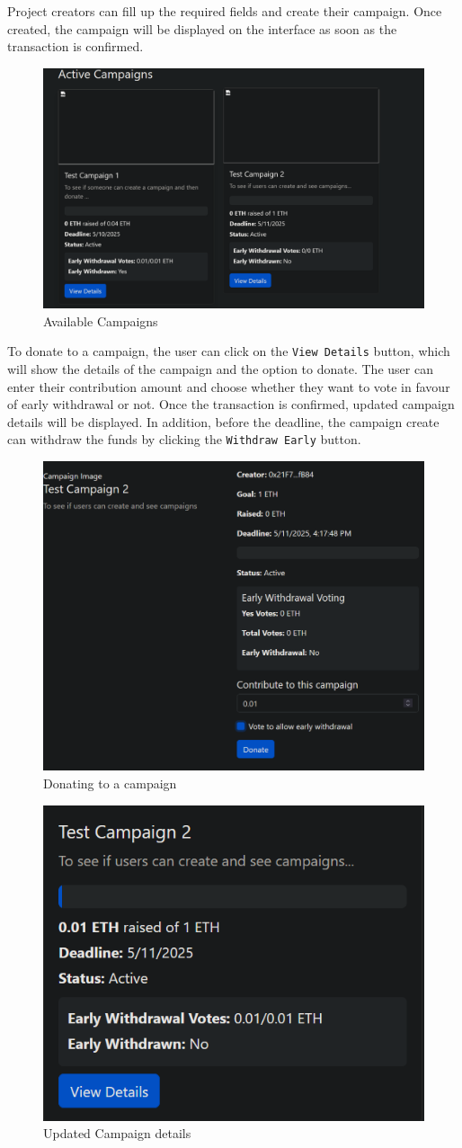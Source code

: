 \documentclass[12pt,reqno]{article}
\begin{document}
Project creators can fill up the required fields and create their 
campaign. Once created, the campaign will be displayed on the 
interface as soon as the transaction is confirmed. 

\begin{figure}[h!]
    \centering
    \includegraphics[width=0.6\linewidth]{Pictures/ui2.png}
    \caption{Available Campaigns}
    \label{cam_display}
\end{figure}

To donate to a campaign, the user can click on the 
\texttt{View Details} button, which will show the details 
of the campaign and the option to donate. The user can enter their 
contribution amount and choose whether they want to vote in favour 
of early withdrawal or not. Once the transaction is confirmed, 
updated campaign details will be displayed. In addition, before 
the deadline, the campaign create can withdraw the funds by clicking 
the \texttt{Withdraw Early} button. 

\begin{figure}[h!]
    \centering
    \includegraphics[width=0.6\linewidth]{Pictures/ui3.png}
    \caption{Donating to a campaign}
    \label{donation}
\end{figure}

\begin{figure}[h!]
    \centering
    \includegraphics[width=0.6\linewidth]{Pictures/ui4.png}
    \caption{Updated Campaign details}
    \label{donation2}
\end{figure}
\end{document}
